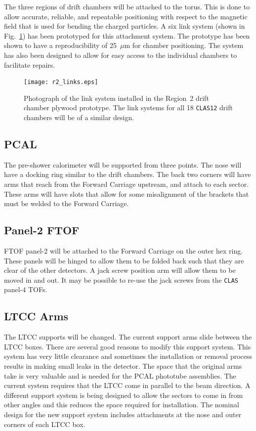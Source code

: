 The three regions of drift chambers will be attached to the torus.  This 
is done to allow accurate, reliable, and repeatable positioning with respect 
to the magnetic field that is used for bending the charged particles.
A six link system (shown in Fig.~\ref{dc_links}) has been prototyped for 
this attachment system.  The prototype has been shown to have a 
reproducibility of 25~$\mu$m for chamber positioning.  The system has also 
been designed to allow for easy access to the individual chambers to 
facilitate repairs.

\begin{figure}[htbp]
\centering
\texttt{[image: r2\_links.eps]}
\caption{\small{Photograph of the link system installed in the
Region~2 drift chamber plywood prototype.  The link systems for
all 18 {\tt CLAS12} drift chambers will be of a similar design.}}
\label{dc_links}
\end{figure}

\subsection{PCAL}

The pre-shower calorimeter will be supported from three points. The nose will 
have a docking ring similar to the drift chambers. The back two corners will 
have arms that reach from the Forward Carriage upstream, and attach to each 
sector.  These arms will have slots that allow for some misalignment of the 
brackets that must be welded to the Forward Carriage.

\subsection{Panel-2 FTOF}
 
FTOF panel-2 will be attached to the Forward Carriage on the outer hex ring. 
These panels will be hinged to allow them to be folded back such that 
they are clear of the other detectors.  A jack screw position arm will allow 
them to be moved in and out. It may be possible to re-use the jack screws 
from the {\tt CLAS} panel-4 TOFs.

\subsection{LTCC Arms}

The LTCC supports will be changed. The current support arms slide between 
the LTCC boxes. There are several good reasons to modify this support system.
This system has very little clearance and sometimes the installation or 
removal process results in making small leaks in the detector.  The space 
that the original arms take is very valuable and is needed for the PCAL 
phototube assemblies.  The current system requires that the LTCC come in 
parallel to the beam direction.  A different support system is being designed 
to allow the sectors to come in from other angles and this reduces the space 
required for installation.  The nominal design for the new support system
includes attachments at the nose and outer corners of each LTCC box.

